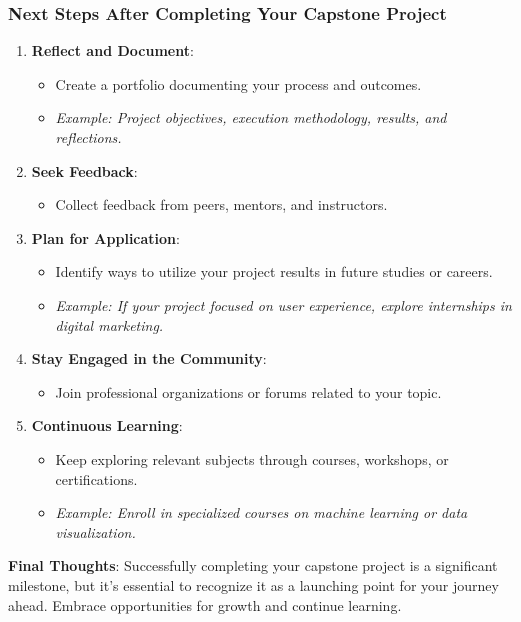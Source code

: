 \documentclass[aspectratio=169]{beamer}
\begin{document}
\begin{frame}[fragile]
    \frametitle{Next Steps After Completing Your Capstone Project}
    
    \begin{enumerate}
        \item \textbf{Reflect and Document}:
        \begin{itemize}
            \item Create a portfolio documenting your process and outcomes.
            \item \textit{Example: Project objectives, execution methodology, results, and reflections.}
        \end{itemize}
        
        \item \textbf{Seek Feedback}:
        \begin{itemize}
            \item Collect feedback from peers, mentors, and instructors.
        \end{itemize}

        \item \textbf{Plan for Application}:
        \begin{itemize}
            \item Identify ways to utilize your project results in future studies or careers.
            \item \textit{Example: If your project focused on user experience, explore internships in digital marketing.}
        \end{itemize}

        \item \textbf{Stay Engaged in the Community}:
        \begin{itemize}
            \item Join professional organizations or forums related to your topic.
        \end{itemize}

        \item \textbf{Continuous Learning}:
        \begin{itemize}
            \item Keep exploring relevant subjects through courses, workshops, or certifications.
            \item \textit{Example: Enroll in specialized courses on machine learning or data visualization.}
        \end{itemize}
    \end{enumerate}
    
    \textbf{Final Thoughts}: 
    Successfully completing your capstone project is a significant milestone, but it's essential to recognize it as a launching point for your journey ahead. Embrace opportunities for growth and continue learning.
\end{frame}
\end{document}

